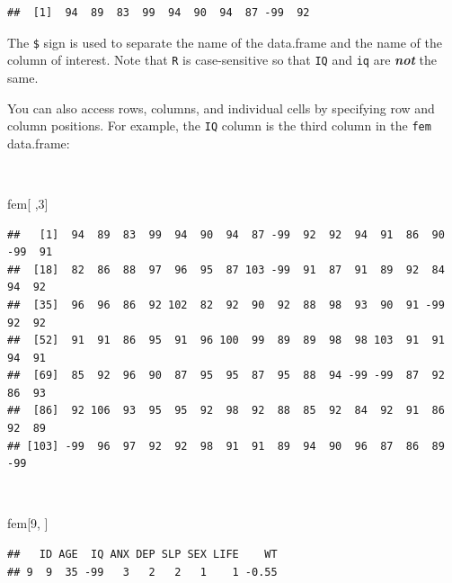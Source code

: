 \documentclass[12pt,a4paper]{book}
\newenvironment{Shaded}{\begin{snugshade}}{\end{snugshade}}
\newcommand{\DecValTok}[1]{\textcolor[rgb]{0.00,0.00,0.81}{#1}}
\newcommand{\NormalTok}[1]{#1}
\newcommand{\OperatorTok}[1]{\textcolor[rgb]{0.81,0.36,0.00}{\textbf{#1}}}
\theoremstyle{definition}
\theoremstyle{definition}
\theoremstyle{definition}
\theoremstyle{remark}
\begin{document}
\begin{Shaded}
\end{Shaded}

\begin{verbatim}
##  [1]  94  89  83  99  94  90  94  87 -99  92
\end{verbatim}

\newpage

The \texttt{\$} sign is used to separate the name of the data.frame and
the name of the column of interest. Note that \texttt{R} is
case-sensitive so that \texttt{IQ} and \texttt{iq} are
\textbf{\emph{not}} the same.

You can also access rows, columns, and individual cells by specifying
row and column positions. For example, the \texttt{IQ} column is the
third column in the \texttt{fem} data.frame:

~

\begin{Shaded}
\begin{Highlighting}[]
\NormalTok{fem[ ,}\DecValTok{3}\NormalTok{]}
\end{Highlighting}
\end{Shaded}

\begin{verbatim}
##   [1]  94  89  83  99  94  90  94  87 -99  92  92  94  91  86  90 -99  91
##  [18]  82  86  88  97  96  95  87 103 -99  91  87  91  89  92  84  94  92
##  [35]  96  96  86  92 102  82  92  90  92  88  98  93  90  91 -99  92  92
##  [52]  91  91  86  95  91  96 100  99  89  89  98  98 103  91  91  94  91
##  [69]  85  92  96  90  87  95  95  87  95  88  94 -99 -99  87  92  86  93
##  [86]  92 106  93  95  95  92  98  92  88  85  92  84  92  91  86  92  89
## [103] -99  96  97  92  92  98  91  91  89  94  90  96  87  86  89 -99
\end{verbatim}

~

\begin{Shaded}
\begin{Highlighting}[]
\NormalTok{fem[}\DecValTok{9}\NormalTok{, ]}
\end{Highlighting}
\end{Shaded}

\begin{verbatim}
##   ID AGE  IQ ANX DEP SLP SEX LIFE    WT
## 9  9  35 -99   3   2   2   1    1 -0.55
\end{verbatim}
\end{document}
